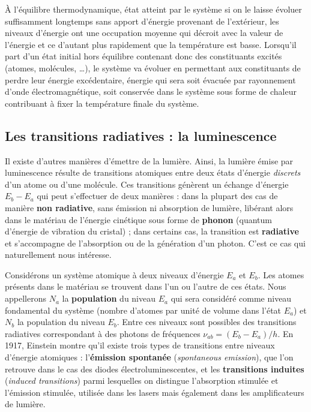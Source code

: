 \begin{remark}
  À l'équilibre thermodynamique, état atteint par le système si on le laisse
  évoluer suffisamment longtemps sans apport d'énergie provenant de
  l'extérieur, les niveaux d'énergie ont une occupation moyenne qui décroit avec
  la valeur de l'énergie et ce d'autant plus rapidement que la température est
  basse. Lorsqu'il part d'un état initial hors équilibre contenant donc des
  constituants excités (atomes, molécules, …), le système va évoluer en
  permettant aux constituants de perdre leur énergie excédentaire, énergie qui
  sera soit évacuée par rayonnement d'onde électromagnétique, soit conservée
  dans le système sous forme de chaleur contribuant à fixer la température
  finale du système.
\end{remark}

\subsection{Les transitions radiatives : la luminescence}
Il existe d'autres manières d'émettre de la lumière. Ainsi, la lumière émise par
luminescence résulte de transitions atomiques entre deux états d'énergie
\emph{discrets} d'un atome ou d'une molécule. Ces transitions génèrent un
échange d'énergie $E_b-E_a$ qui peut s'effectuer de deux manières : dans la
plupart des cas de manière \textbf{non radiative}, sans émission ni absorption
de lumière, libérant alors dans le matériau de l'énergie cinétique sous forme de
\textbf{phonon} (quantum d'énergie de vibration du cristal) ; dans certains cas,
la transition est \textbf{radiative} et s'accompagne de l'absorption ou de la
génération d'un photon. C'est ce cas qui naturellement nous intéresse.

Considérons un système atomique à deux niveaux d'énergie $E_a$ et $E_b$. Les
atomes présents dans le matériau se trouvent dans l'un ou l'autre de ces états.
Nous appellerons $N_a$ la \textbf{population} du niveau $E_a$ qui sera considéré
comme niveau fondamental du système (nombre d'atomes par unité de volume dans
l'état $E_a$) et $N_b$ la population du niveau $E_b$. Entre ces niveaux sont
possibles des transitions radiatives correspondant à des photons de fréquences
$\nu_{ab}=(E_b-E_a)/h$. En 1917, Einstein montre qu'il existe trois types de
transitions entre niveaux d'énergie atomiques : l'\textbf{émission spontanée}
(\textit{spontaneous emission}), que l'on retrouve dans le cas des diodes
électroluminescentes, et les \textbf{transitions induites} (\textit{induced
transitions}) parmi lesquelles on distingue l'absorption stimulée et l'émission
stimulée, utilisée dans les lasers mais également dans les amplificateurs de
lumière.

